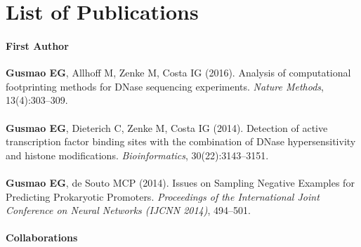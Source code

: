\chapter*{List of Publications}

\subsubsection*{First Author}

\begin{addmargin}{0.05\textwidth}
\noindent
\textbf{Gusmao EG}, Allhoff M, Zenke M, Costa IG (2016). Analysis of computational footprinting methods for DNase sequencing experiments. \textit{Nature Methods}, 13(4):303--309.\\ \\
\noindent
\textbf{Gusmao EG}, Dieterich C, Zenke M, Costa IG (2014). Detection of active transcription factor binding sites with the combination of DNase hypersensitivity and histone modifications. \textit{Bioinformatics}, 30(22):3143--3151.\\ \\
\noindent
\textbf{Gusmao EG}, de Souto MCP (2014). Issues on Sampling Negative Examples for Predicting Prokaryotic Promoters. \textit{Proceedings of the International Joint Conference on Neural Networks (IJCNN 2014)}, 494--501.
\end{addmargin} 


\subsubsection*{Collaborations}

